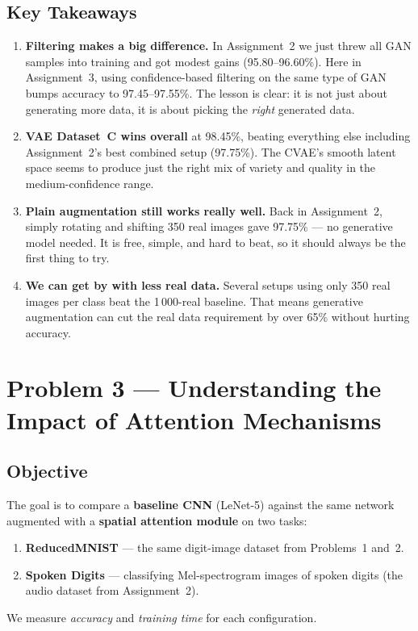 \documentclass[12pt, a4paper]{article}
\begin{document}
\subsection{Key Takeaways}

\begin{enumerate}
    \item \textbf{Filtering makes a big difference.}
          In Assignment~2 we just threw all GAN samples into training and got modest
          gains (95.80--96.60\%).  Here in Assignment~3, using confidence-based
          filtering on the same type of GAN bumps accuracy to 97.45--97.55\%.  The
          lesson is clear: it is not just about generating more data, it is about
          picking the \emph{right} generated data.

    \item \textbf{VAE Dataset~C wins overall} at 98.45\%, beating everything else
          including Assignment~2's best combined setup (97.75\%).  The CVAE's smooth
          latent space seems to produce just the right mix of variety and quality
          in the medium-confidence range.

    \item \textbf{Plain augmentation still works really well.}
          Back in Assignment~2, simply rotating and shifting 350 real images gave
          97.75\% --- no generative model needed.  It is free, simple, and hard
          to beat, so it should always be the first thing to try.

    \item \textbf{We can get by with less real data.}
          Several setups using only 350 real images per class beat the 1\,000-real
          baseline.  That means generative augmentation can cut the real data
          requirement by over 65\% without hurting accuracy.
\end{enumerate}

\newpage
\section{Problem 3 --- Understanding the Impact of Attention Mechanisms}

\subsection{Objective}

The goal is to compare a \textbf{baseline CNN} (LeNet-5) against the same network
augmented with a \textbf{spatial attention module} on two tasks:
\begin{enumerate}
    \item \textbf{ReducedMNIST} --- the same digit-image dataset from Problems~1 and~2.
    \item \textbf{Spoken Digits} --- classifying Mel-spectrogram images of spoken digits
          (the audio dataset from Assignment~2).
\end{enumerate}
We measure \emph{accuracy} and \emph{training time} for each configuration.
\end{document}
